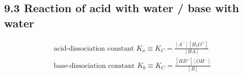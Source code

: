 \subsection{9.3 Reaction of acid with water / base with water}
    \begin{gather*}
    \textrm{acid-dissociation constant } K_a \equiv K_C = \frac{[A^-] [H_3O^+]}{[HA]}\\
    \textrm{base-dissociation constant } K_b \equiv K_C = \frac{[HB^+] [OH^-]}{[B]}
    \end{gather*}